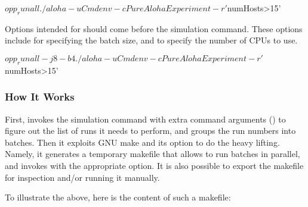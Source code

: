\begin{commandline}
$ opp_runall ./aloha -u Cmdenv -c PureAlohaExperiment -r '$numHosts>15'
\end{commandline}

Options intended for  should come before the simulation
command. These options include  for specifying the batch size, and
 to specify the number of CPUs to use.

\begin{commandline}
$ opp_runall -j8 -b4 ./aloha -u Cmdenv -c PureAlohaExperiment -r '$numHosts>15'
\end{commandline}


\subsubsection{How It Works}
\label{sec:run-sim:opp-runall:operation}

First,  invokes the simulation command with extra command
arguments () to figure out the list of runs it needs to
perform, and groups the run numbers into batches. Then it exploits GNU make and
its  option to do the heavy lifting. Namely, it generates a
temporary makefile that allows  to run batches in parallel, and
invokes  with the appropriate  option. It is also possible
to export the makefile for inspection and/or running it manually.

To illustrate the above, here is the content of such a makefile:



